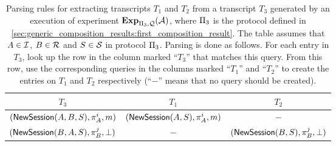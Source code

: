 \newcommand{\NULL}{\multicolumn{1}{c}{$-$}}


\renewcommand{\arraystretch}{1.2}







\begin{landscape}

\thispagestyle{empty}


\begin{table}

	\captionsetup{width=1.1\textwidth}

	\centering
	\scriptsize
	\caption{Parsing rules for extracting transcripts $T_1$ and $T_2$ from a transcript $T_3$
	generated by an execution of experiment $\mathbf{Exp}_{\mathrm{\Pi}_3,\mathcal{Q}}(\mathcal{A})$,
	where $\mathrm{\Pi}_3$ is the protocol defined in \cref{sec:generic_composition_results:first_composition_result}.
	The table assumes that $A \in \mathcal{I}$, $B \in \mathcal{R}$ and $S \in \mathcal{S}$ in protocol $\mathrm{\Pi}_3$.
	Parsing is done as follows.
	For each entry in $T_3$, look up the row in the column marked ``$T_3$'' that matches this query.
	From this row, use the corresponding queries in the columns marked ``$T_1$'' and ``$T_2$''
	to create the entries on $T_1$ and $T_2$ respectively
	(``$-$'' means that no query should be created).}\label{tab:f3_parsing}
	
	
\begin{threeparttable}
	
	\begin{tabular}{  l  l  l }
		\toprule
		
		\multicolumn{1}{c}{\large$T_3$} & \multicolumn{1}{c}{\large$T_1$} &  \multicolumn{1}{c}{\large$T_2$}\\
		
		\midrule
		
		\rowcolor{ProtocolOneColor}
		$(\Q{NewSession}(A,B, S ),\oracle[A][i], m)$  & $(\Q{NewSession}(A,  S ),\oracle[A][i], m)$& \NULL \\
		
		\rowcolor{ProtocolTwoColor}
		$(\Q{NewSession}(B, A, S ),\oracle[B][j], \bot)$  &\NULL &  $(\Q{NewSession}(B,  S ),\oracle[B][j], \bot )$ \\
		

\end{tabular}
\end{threeparttable}
\end{table}
\end{landscape}
